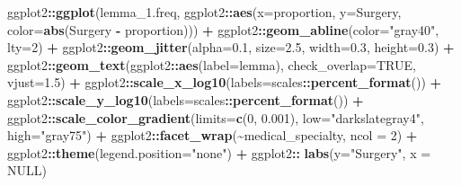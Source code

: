 \documentclass[
]{article}
\newenvironment{Shaded}{\begin{snugshade}}{\end{snugshade}}
\newcommand{\AttributeTok}[1]{\textcolor[rgb]{0.13,0.29,0.53}{#1}}
\newcommand{\ConstantTok}[1]{\textcolor[rgb]{0.56,0.35,0.01}{#1}}
\newcommand{\DecValTok}[1]{\textcolor[rgb]{0.00,0.00,0.81}{#1}}
\newcommand{\FloatTok}[1]{\textcolor[rgb]{0.00,0.00,0.81}{#1}}
\newcommand{\FunctionTok}[1]{\textcolor[rgb]{0.13,0.29,0.53}{\textbf{#1}}}
\newcommand{\NormalTok}[1]{#1}
\newcommand{\SpecialCharTok}[1]{\textcolor[rgb]{0.81,0.36,0.00}{\textbf{#1}}}
\newcommand{\StringTok}[1]{\textcolor[rgb]{0.31,0.60,0.02}{#1}}
\begin{document}
\begin{Shaded}
\begin{Highlighting}[]
\NormalTok{ggplot2}\SpecialCharTok{::}\FunctionTok{ggplot}\NormalTok{(lemma\_1.freq, ggplot2}\SpecialCharTok{::}\FunctionTok{aes}\NormalTok{(}\AttributeTok{x=}\NormalTok{proportion, }
                                         \AttributeTok{y=}\StringTok{\textasciigrave{}}\AttributeTok{Surgery}\StringTok{\textasciigrave{}}\NormalTok{,}
                                         \AttributeTok{color=}\FunctionTok{abs}\NormalTok{(}\StringTok{\textasciigrave{}}\AttributeTok{Surgery}\StringTok{\textasciigrave{}} \SpecialCharTok{{-}}\NormalTok{ proportion))) }\SpecialCharTok{+} 
\NormalTok{  ggplot2}\SpecialCharTok{::}\FunctionTok{geom\_abline}\NormalTok{(}\AttributeTok{color=}\StringTok{"gray40"}\NormalTok{, }\AttributeTok{lty=}\DecValTok{2}\NormalTok{) }\SpecialCharTok{+}
\NormalTok{  ggplot2}\SpecialCharTok{::}\FunctionTok{geom\_jitter}\NormalTok{(}\AttributeTok{alpha=}\FloatTok{0.1}\NormalTok{, }\AttributeTok{size=}\FloatTok{2.5}\NormalTok{, }\AttributeTok{width=}\FloatTok{0.3}\NormalTok{, }\AttributeTok{height=}\FloatTok{0.3}\NormalTok{) }\SpecialCharTok{+}
\NormalTok{  ggplot2}\SpecialCharTok{::}\FunctionTok{geom\_text}\NormalTok{(ggplot2}\SpecialCharTok{::}\FunctionTok{aes}\NormalTok{(}\AttributeTok{label=}\NormalTok{lemma), }\AttributeTok{check\_overlap=}\ConstantTok{TRUE}\NormalTok{, }\AttributeTok{vjust=}\FloatTok{1.5}\NormalTok{) }\SpecialCharTok{+}
\NormalTok{  ggplot2}\SpecialCharTok{::}\FunctionTok{scale\_x\_log10}\NormalTok{(}\AttributeTok{labels=}\NormalTok{scales}\SpecialCharTok{::}\FunctionTok{percent\_format}\NormalTok{()) }\SpecialCharTok{+} 
\NormalTok{  ggplot2}\SpecialCharTok{::}\FunctionTok{scale\_y\_log10}\NormalTok{(}\AttributeTok{labels=}\NormalTok{scales}\SpecialCharTok{::}\FunctionTok{percent\_format}\NormalTok{()) }\SpecialCharTok{+} 
\NormalTok{  ggplot2}\SpecialCharTok{::}\FunctionTok{scale\_color\_gradient}\NormalTok{(}\AttributeTok{limits=}\FunctionTok{c}\NormalTok{(}\DecValTok{0}\NormalTok{, }\FloatTok{0.001}\NormalTok{), }\AttributeTok{low=}\StringTok{"darkslategray4"}\NormalTok{, }\AttributeTok{high=}\StringTok{"gray75"}\NormalTok{) }\SpecialCharTok{+}
\NormalTok{  ggplot2}\SpecialCharTok{::}\FunctionTok{facet\_wrap}\NormalTok{(}\SpecialCharTok{\textasciitilde{}}\NormalTok{medical\_specialty, }\AttributeTok{ncol =} \DecValTok{2}\NormalTok{) }\SpecialCharTok{+}
\NormalTok{  ggplot2}\SpecialCharTok{::}\FunctionTok{theme}\NormalTok{(}\AttributeTok{legend.position=}\StringTok{"none"}\NormalTok{) }\SpecialCharTok{+}
\NormalTok{  ggplot2}\SpecialCharTok{::} \FunctionTok{labs}\NormalTok{(}\AttributeTok{y=}\StringTok{"Surgery"}\NormalTok{, }\AttributeTok{x =} \ConstantTok{NULL}\NormalTok{)}
\end{Highlighting}
\end{Shaded}
\end{document}
